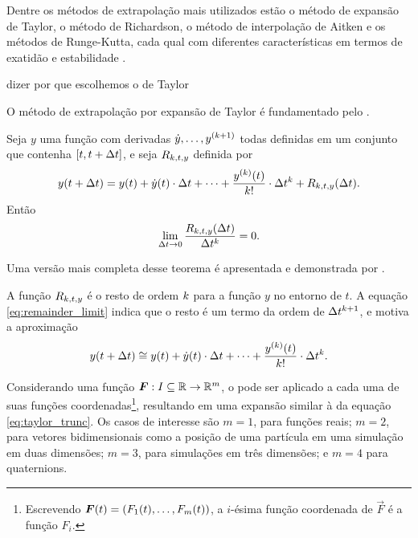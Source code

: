 Dentre os métodos de extrapolação mais utilizados estão o método de expansão de Taylor, o método de Richardson, o método de interpolação de Aitken e os métodos de Runge-Kutta, cada qual com diferentes características em termos de exatidão e estabilidade \cite{bib:gear_book}.

\alert{dizer por que escolhemos o de Taylor}

O método de extrapolação por expansão de Taylor é fundamentado pelo .

\begin{theorem} \label{theo:taylor}
	Seja \(y\) uma função com derivadas \(\deriv{1}{y},\dots,y^{\pqty{\taylorOrder+1}}\) todas definidas em um conjunto que contenha \(\bqty{t, t+\Dt}\), e seja \(R_{k, t, y}\) definida por
    \begin{equation*}
    	y(t + \Dt) = y(t) + \deriv{1}{y}(t)\cdot\Dt + \dots + \dfrac{\deriv{\taylorOrder}{y}(t)}{\taylorOrder!}\cdot\Dt^\taylorOrder + R_{\taylorOrder, t, y}(\Dt).
    \end{equation*}
    Então
    \begin{equation} \label{eq:remainder_limit}
    	\lim_{\Delta t \rightarrow 0} \dfrac{R_{k, t, y}(\Delta t)}{\Delta t^k} = 0.
    \end{equation}
\end{theorem}

Uma versão mais completa desse teorema é apresentada e demonstrada por .

A função \(R_{k, t, y}\) é o resto de ordem \(k\) para a função \(y\) no entorno de \(t\). A equação \eqref{eq:remainder_limit} indica que o resto é um termo da ordem de \(\Delta t^{k+1}\), e motiva a aproximação
\begin{equation} \label{eq:taylor_trunc}
    y(t + \Dt) \approximately y(t) + \deriv{1}{y}(t)\cdot\Dt + \dots + \dfrac{\deriv{\taylorOrder}{y}(t)}{\taylorOrder!}\cdot\Dt^\taylorOrder.
\end{equation}

Considerando uma função \(\bm{F}:I\subseteq \mathbb{R} \rightarrow \mathbb{R}^m\), o  pode ser aplicado a cada uma de suas funções coordenadas\footnote{Escrevendo \(\vec{F}(t) = \pqty{F_1(t),\dots,F_m(t)}\), a \(i\)-ésima função coordenada de \(\vec{F}\) é a função \(F_i\).}, resultando em uma expansão similar à da equação \eqref{eq:taylor_trunc}. Os casos de interesse são \(m=1\), para funções reais; \(m=2\), para vetores bidimensionais como a posição de uma partícula em uma simulação em duas dimensões; \(m=3\), para simulações em três dimensões; \alert{e \(m=4\) para quaternions}.

